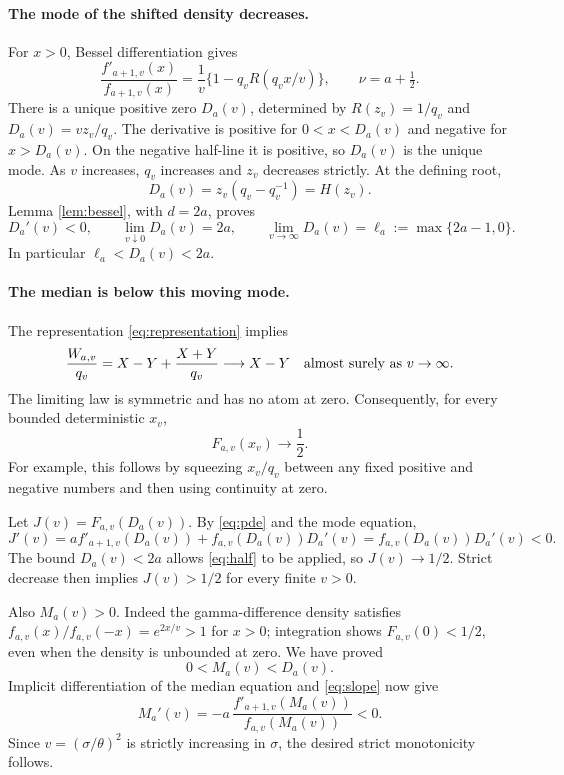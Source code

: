 \documentclass[11pt]{article}
\begin{document}
\paragraph{The mode of the shifted density decreases.}
For \(x>0\), Bessel differentiation gives
\begin{equation}\label{eq:slope}
 \frac{f'_{a+1,v}(x)}{f_{a+1,v}(x)}
 =\frac1v\{1-q_vR(q_vx/v)\},
 \qquad \nu=a+\tfrac12.
\end{equation}
There is a unique positive zero \(D_a(v)\), determined by
\(R(z_v)=1/q_v\) and \(D_a(v)=vz_v/q_v\).
The derivative is positive for \(0<x<D_a(v)\) and negative for
\(x>D_a(v)\). On the negative half-line it is positive, so \(D_a(v)\)
is the unique mode. As \(v\) increases, \(q_v\) increases and \(z_v\)
decreases strictly. At the defining root,
\[
 D_a(v)=z_v(q_v-q_v^{-1})=H(z_v).
\]
Lemma \ref{lem:bessel}, with \(d=2a\), proves
\begin{equation}\label{eq:mode}
 D_a'(v)<0,\qquad
 \lim_{v\downarrow0}D_a(v)=2a,\qquad
 \lim_{v\to\infty}D_a(v)=\ell_a:=\max\{2a-1,0\}.
\end{equation}
In particular \(\ell_a<D_a(v)<2a\).

\paragraph{The median is below this moving mode.}
The representation \eqref{eq:representation} implies
\[
 \frac{W_{a,v}}{q_v}
   =X-Y+\frac{X+Y}{q_v}\longrightarrow X-Y
 \quad\hbox{almost surely as }v\to\infty.
\]
The limiting law is symmetric and has no atom at zero.
Consequently, for every bounded deterministic \(x_v\),
\begin{equation}\label{eq:half}
 F_{a,v}(x_v)\longrightarrow\frac12.
\end{equation}
For example, this follows by squeezing \(x_v/q_v\) between any fixed
positive and negative numbers and then using continuity at zero.

Let \(J(v)=F_{a,v}(D_a(v))\). By \eqref{eq:pde} and the mode equation,
\[
 J'(v)
 =a f'_{a+1,v}(D_a(v))+f_{a,v}(D_a(v))D_a'(v)
 =f_{a,v}(D_a(v))D_a'(v)<0.
\]
The bound \(D_a(v)<2a\) allows \eqref{eq:half} to be applied, so
\(J(v)\to1/2\). Strict decrease then implies \(J(v)>1/2\) for every
finite \(v>0\).

Also \(M_a(v)>0\). Indeed the gamma-difference density satisfies
\(f_{a,v}(x)/f_{a,v}(-x)=e^{2x/v}>1\) for \(x>0\); integration
shows \(F_{a,v}(0)<1/2\), even when the density is unbounded at zero.
We have proved
\begin{equation}\label{eq:medianmode}
 0<M_a(v)<D_a(v).
\end{equation}
Implicit differentiation of the median equation and \eqref{eq:slope}
now give
\begin{equation}\label{eq:Mprime}
 M_a'(v)
 =-a\,\frac{f'_{a+1,v}(M_a(v))}{f_{a,v}(M_a(v))}<0.
\end{equation}
Since \(v=(\sigma/\theta)^2\) is strictly increasing in \(\sigma\),
the desired strict monotonicity follows.
\end{document}
